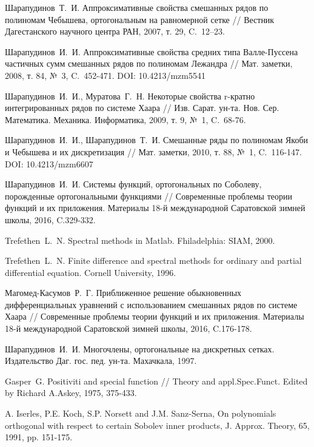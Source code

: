 \begin{thebibliography}{999}
 Шарапудинов~Т.~И. Аппроксимативные свойства смешанных рядов по полиномам Чебышева, ортогональным на равномерной сетке // Вестник Дагестанского научного центра РАН, 2007, т. 29, C.~12–23.


 Шарапудинов~И.~И. Аппроксимативные свойства средних типа Валле-Пуссена частичных сумм смешанных рядов по полиномам Лежандра // Мат. заметки, 2008, т. 84, №~3, C.~452-471. DOI: 10.4213/mzm5541


 Шарапудинов~И.~И., Муратова~Г.~Н. Некоторые свойства r-кратно интегрированных рядов по системе Хаара // Изв. Сарат. ун-та. Нов. Сер. Математика. Механика. Информатика, 2009, т. 9, №~1, C.~68-76.


 Шарапудинов~И.~И., Шарапудинов~Т.~И. Смешанные ряды по полиномам Якоби и Чебышева и их дискретизация // Мат. заметки, 2010, т. 88, №~1, C.~116-147. DOI: 10.4213/mzm6607


 Шарапудинов~И.~И. Системы функций, ортогональных по Соболеву, порожденные ортогональными функциями // Современные проблемы теории функций и их приложения.  Материалы 18-й международной Саратовской зимней школы, 2016, C.329-332.


 Trefethen~L.~N. Spectral methods in Matlab. Fhiladelphia: SIAM, 2000.


 Trefethen~L.~N. Finite difference and spectral methods for ordinary and partial differential equation. Cornell University, 1996.


 Магомед-Касумов~Р.~Г. Приближенное решение обыкновенных дифференциальных уравнений с использованием смешанных рядов по системе Хаара // Современные проблемы теории функций и их приложения.  Материалы 18-й международной Саратовской зимней школы, 2016, C.176-178.


 Шарапудинов~И.~И. Многочлены, ортогональные на дискретных сетках. Издательство Даг. гос. пед. ун-та. Махачкала, 1997.


 Gasper~G. Positiviti and special function // Theory and appl.Spec.Funct. Edited by Richard A.Askey, 1975, 375-433.





A. Iserles, P.E. Koch, S.P. Norsett and J.M. Sanz-Serna,
On polynomials  orthogonal  with respect  to certain Sobolev inner products,
J. Approx. Theory, 65, 1991, pp. 151-175.





\end{thebibliography}
